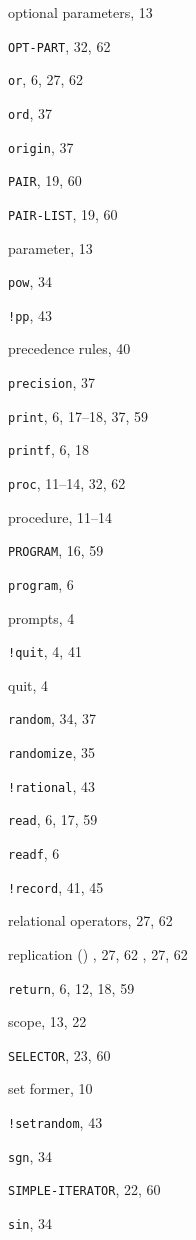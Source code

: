 \begin{theindex}
\item {optional parameters}, 13
\item {{\tt OPT-PART}}, 32, 62
\item {{\tt or}}, 6, 27, 62
\item {{\tt ord}}, 37
\item {{\tt origin}}, 37
\indexspace
\item {{\tt PAIR}}, 19, 60
\item {{\tt PAIR-LIST}}, 19, 60
\item {parameter}, 13
\item {{\tt pow}}, 34
\item {{\tt !pp}}, 43
\item {precedence rules}, 40
\item {{\tt precision}}, 37
\item {{\tt print}}, 6, 17--18, 37, 59
\item {{\tt printf}}, 6, 18
\item {{\tt proc}}, 11--14, 32, 62
\item {procedure}, 11--14
\item {{\tt PROGRAM}}, 16, 59
\item {{\tt program}}, 6
\item {prompts}, 4
\indexspace
\item {{\tt !quit}}, 4, 41
\item {quit}, 4
\indexspace
\item {{\tt random}}, 34, 37
\item {{\tt randomize}}, 35
\item {{\tt !rational}}, 43
\item {{\tt read}}, 6, 17, 59
\item {{\tt readf}}, 6
\item {{\tt !record}}, 41, 45
\item {relational operators}, 27, 62
\item {replication ({\tt *})}
	, 27, 62
	, 27, 62
\item {{\tt return}}, 6, 12, 18, 59
\indexspace
\item {scope}, 13, 22
\item {{\tt SELECTOR}}, 23, 60
\item {set former}, 10
\item {{\tt !setrandom}}, 43
\item {{\tt sgn}}, 34
\item {{\tt SIMPLE-ITERATOR}}, 22, 60
\item {{\tt sin}}, 34

\end{theindex}
